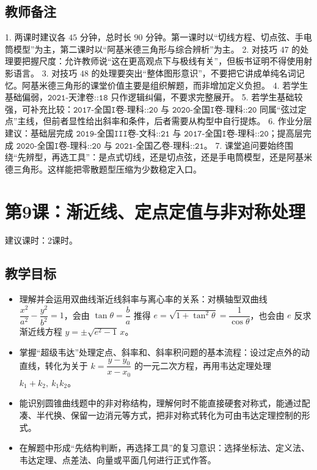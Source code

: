 \documentclass[UTF8,a4paper,11pt]{ctexart}
\begin{document}
\subsection*{教师备注}

1. 两课时建议各 $45$ 分钟，总时长 $90$ 分钟。第一课时以“切线方程、切点弦、手电筒模型”为主，第二课时以“阿基米德三角形与综合辨析”为主。
2. 对技巧 $47$ 的处理要把握尺度：允许教师说“这在更高观点下与极线有关”，但板书证明不得使用射影语言。
3. 对技巧 $48$ 的处理要突出“整体图形意识”，不要把它讲成单纯名词记忆。阿基米德三角形的课堂价值主要是组织解题，而非增加定义负担。
4. 若学生基础偏弱，$\texttt{2021-天津卷::18}$ 只作逻辑纠偏，不要求完整展开。
5. 若学生基础较强，可补充比较：$\texttt{2017-全国I卷-理科::20}$ 与 $\texttt{2020-全国I卷-理科::20}$ 同属“弦过定点”主线，但前者显性给出斜率和条件，后者需要从构型中自行提炼。
6. 作业分层建议：基础层完成 $\texttt{2019-全国III卷-文科::21}$ 与 $\texttt{2017-全国I卷-理科::20}$；提高层完成 $\texttt{2020-全国I卷-理科::20}$ 与 $\texttt{2021-全国乙卷-理科::21}$。
7. 课堂追问要始终围绕“先辨型，再选工具”：是点式切线，还是切点弦，还是手电筒模型，还是阿基米德三角形。这样能把零散题型压缩为少数稳定入口。

\clearpage

\section{第9课：渐近线、定点定值与非对称处理}

\noindent 建议课时：2课时。

\subsection*{教学目标}

\begin{itemize}

\item 理解并会运用双曲线渐近线斜率与离心率的关系：对横轴型双曲线 $\dfrac{x^2}{a^2}-\dfrac{y^2}{b^2}=1$，会由 $\tan\theta=\dfrac{b}{a}$ 推得 $e=\sqrt{1+\tan^2\theta}=\dfrac{1}{\cos\theta}$，也会由 $e$ 反求渐近线方程 $y=\pm\sqrt{e^2-1}\,x$。

\item 掌握“超级韦达”处理定点、斜率和、斜率积问题的基本流程：设过定点外的动直线，转化为关于 $k=\dfrac{y-y_0}{x-x_0}$ 的一元二次方程，再用韦达定理处理 $k_1+k_2,\ k_1k_2$。

\item 能识别圆锥曲线题中的非对称结构，理解何时不能直接硬套对称式，能通过配凑、半代换、保留一边消元等方式，把非对称式转化为可由韦达定理控制的形式。

\item 在解题中形成“先结构判断，再选择工具”的复习意识：选择坐标法、定义法、韦达定理、点差法、向量或平面几何进行正式作答。

\end{itemize}
\end{document}
